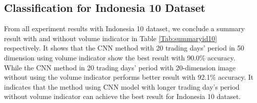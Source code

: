 \documentclass[12pt]{article}
\begin{document}
\subsection{Classification for Indonesia 10 Dataset}
\begin{table}[H]
 \centering
 \caption{Summary result of Indonesia 10 with their best classifier for each trading days and image dimension.}
 \label{Tab:summaryid10}
 \end{table}
From all experiment results with Indonesia 10 dataset, we conclude a summary result with and without volume indicator in Table \ref{Tab:summaryid10} respectively. It shows that the CNN method with 20 trading days’ period in 50 dimension using volume indicator show the best result with 90.0\% accuracy. While the CNN method in 20 trading days’ period with 20-dimension image without using the volume indicator performs better result with 92.1\% accuracy. It indicates that the method using CNN model with longer trading day’s period without volume indicator can achieve the best result for Indonesia 10 dataset.
\end{document}
